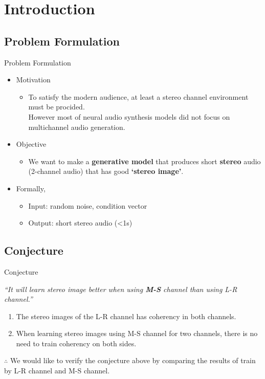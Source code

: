 \section{Introduction}
\subsection{Problem Formulation}
\begin{frame}{Problem Formulation}
    \begin{itemize}
        \item Motivation
        \begin{itemize}
            \item To satisfy the modern audience, at least a stereo channel environment must be procided.\\
            However most of neural audio synthesis models did not focus on multichannel audio generation.
        \end{itemize}
        \bigskip
        \item Objective
        \begin{itemize}
            \item We want to make a \textbf{generative model} that produces short \textbf{stereo} audio (2-channel audio) that has good \textbf{`stereo image'}.
        \end{itemize}
        \bigskip
        \item Formally,
        \begin{itemize}
            \item Input: random noise, condition vector
            \item Output: short stereo audio (<1s)
        \end{itemize}
    \end{itemize}
\end{frame}

\subsection{Conjecture}
\begin{frame}{Conjecture}
    \begin{center}
        \textit{``It will learn stereo image better when using \textbf{M-S} channel than using L-R channel.''}
    \end{center}
    \bigskip
    \bigskip
    \smallskip
    \begin{enumerate}
        \item The stereo images of the L-R channel has coherency in both channels.
        \item When learning stereo images using M-S channel for two channels, there is no need to train coherency on both sides.
    \end{enumerate}
    \bigskip
    $\therefore$ We would like to verify the conjecture above by comparing the results of train by L-R channel and M-S channel.
\end{frame}

